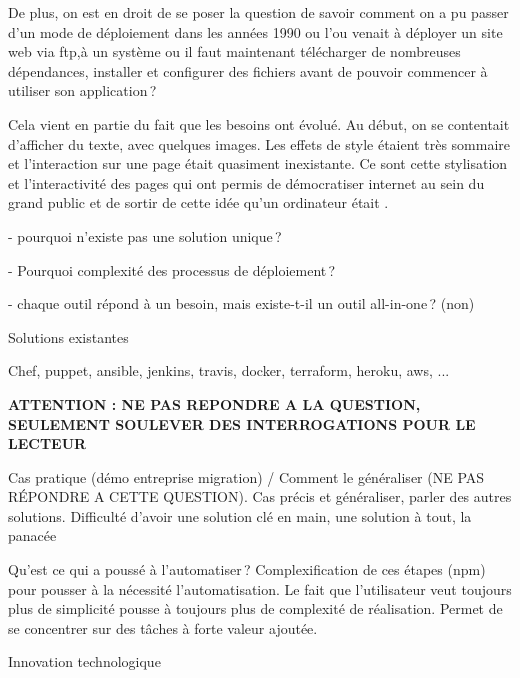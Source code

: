 De plus, on est en droit de se poser la question de savoir comment on a pu passer d'un mode de déploiement dans les années 1990 ou l'ou venait à déployer un site web via \gls{ftp},à un système ou il faut maintenant télécharger de nombreuses dépendances, installer et configurer des fichiers avant de pouvoir commencer à utiliser son application ?

Cela vient en partie du fait que les besoins ont évolué. Au début, on se contentait d'afficher du texte, avec quelques images. Les effets de style étaient très sommaire et l'interaction sur une page était quasiment inexistante. Ce sont cette stylisation et l'interactivité des pages qui ont permis de démocratiser internet au sein du grand public et de sortir de cette idée qu'un ordinateur était .


- pourquoi n'existe pas une solution unique ? 

- Pourquoi complexité des processus de déploiement ? 

- chaque outil répond à un besoin, mais existe-t-il un outil all-in-one ? (non)

Solutions existantes

Chef, puppet, ansible, jenkins, travis, docker, terraform, heroku, aws, ...


\textbf{ATTENTION : NE PAS REPONDRE A LA QUESTION, SEULEMENT SOULEVER DES INTERROGATIONS POUR LE LECTEUR}

Cas pratique (démo entreprise migration) / Comment le généraliser (NE PAS RÉPONDRE A CETTE QUESTION). Cas précis et généraliser, parler des autres solutions. Difficulté d'avoir une solution clé en main, une solution à tout, la panacée

Qu'est ce qui a poussé à l'automatiser ? Complexification de ces étapes (npm) pour pousser à la nécessité l'automatisation. Le fait que l'utilisateur veut toujours plus de simplicité pousse à toujours plus de complexité de réalisation. Permet de se concentrer sur des tâches à forte valeur ajoutée.

Innovation technologique 